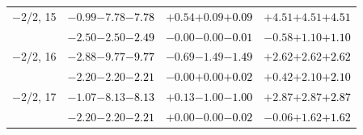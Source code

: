 \documentclass[compress]{beamer}
\begin{document}
\begin{frame}
\begin{tabular}{r | c | c | c}
$-$2/2, 15 & $-0.99$\hspace{0.1 cm}$-7.78$\hspace{0.1 cm}\textcolor{black}{$-7.78$} & $+0.54$\hspace{0.1 cm}$+0.09$\hspace{0.1 cm}\textcolor{black}{$+0.09$} & $+4.51$\hspace{0.1 cm}$+4.51$\hspace{0.1 cm}\textcolor{black}{$+4.51$} \\
           & $-2.50$\hspace{0.1 cm}$-2.50$\hspace{0.1 cm}\textcolor{black}{$-2.49$} & $-0.00$\hspace{0.1 cm}$-0.00$\hspace{0.1 cm}\textcolor{black}{$-0.01$} & $-0.58$\hspace{0.1 cm}$+1.10$\hspace{0.1 cm}\textcolor{black}{$+1.10$} \\
$-$2/2, 16 & $-2.88$\hspace{0.1 cm}$-9.77$\hspace{0.1 cm}\textcolor{black}{$-9.77$} & $-0.69$\hspace{0.1 cm}$-1.49$\hspace{0.1 cm}\textcolor{black}{$-1.49$} & $+2.62$\hspace{0.1 cm}$+2.62$\hspace{0.1 cm}\textcolor{black}{$+2.62$} \\
           & $-2.20$\hspace{0.1 cm}$-2.20$\hspace{0.1 cm}\textcolor{black}{$-2.21$} & $-0.00$\hspace{0.1 cm}$+0.00$\hspace{0.1 cm}\textcolor{black}{$+0.02$} & $+0.42$\hspace{0.1 cm}$+2.10$\hspace{0.1 cm}\textcolor{black}{$+2.10$} \\
$-$2/2, 17 & $-1.07$\hspace{0.1 cm}$-8.13$\hspace{0.1 cm}\textcolor{black}{$-8.13$} & $+0.13$\hspace{0.1 cm}$-1.00$\hspace{0.1 cm}\textcolor{black}{$-1.00$} & $+2.87$\hspace{0.1 cm}$+2.87$\hspace{0.1 cm}\textcolor{black}{$+2.87$} \\
           & $-2.20$\hspace{0.1 cm}$-2.20$\hspace{0.1 cm}\textcolor{black}{$-2.21$} & $+0.00$\hspace{0.1 cm}$-0.00$\hspace{0.1 cm}\textcolor{black}{$-0.02$} & $-0.06$\hspace{0.1 cm}$+1.62$\hspace{0.1 cm}\textcolor{black}{$+1.62$} \\

\end{tabular}
\end{frame}
\end{document}
